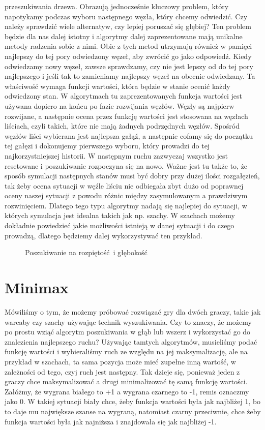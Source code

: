 przeszukiwania drzewa. Obrazują jednocześnie kluczowy problem, który napotykamy podczas wyboru następnego węzła, który chcemy odwiedzić. Czy należy sprawdzić wiele alternatyw, czy lepiej poruszać się głębiej? Ten problem będzie dla nas dalej istotny i algorytmy dalej zaprezentowane mają unikalne metody radzenia sobie z nimi. Obie z tych metod utrzymują również w pamięci najlepszy do tej pory odwiedzony węzeł, aby zwrócić go jako odpowiedź. Kiedy odwiedzamy nowy węzeł, zawsze sprawdzamy, czy nie jest lepszy od do tej pory najlepszego i jeśli tak to zamieniamy najlepszy węzeł na obecnie odwiedzany. Ta właściwość wymaga funkcji wartości, która będzie w stanie ocenić każdy odwiedzony stan. W algorytmach tu zaprezentowanych funkcja wartości jest używana dopiero na końcu po fazie rozwijania węzłów. Węzły są najpierw rozwijane, a następnie ocena przez funkcję wartości jest stosowana na węzłach liściach, czyli takich, które nie mają żadnych podrzędnych węzłów. Spośród węzłów liści wybierana jest najlepsza gałąź, a następnie cofamy się do początku tej gałęzi i dokonujemy pierwszego wyboru, który prowadzi do tej najkorzystniejszej historii. W następnym ruchu zazwyczaj wszystko jest resetowane i poszukiwanie rozpoczyna się na nowo. Ważne jest tu także to, że sposób symulacji następnych stanów musi być dobry przy dużej ilości rozgałęzień, tak żeby ocena sytuacji w węźle liściu nie odbiegała zbyt dużo od poprawnej oceny naszej sytuacji z powodu różnic między zasymulowanym a prawdziwym rozwinięciem. Dlatego tego typu algorytmy nadają się najlepiej do sytuacji, w których symulacja jest idealna takich jak np. szachy. W szachach możemy dokładnie powiedzieć jakie możliwości istnieją w danej sytuacji i do czego prowadzą, dlatego będziemy dalej wykorzystywać ten przykład.

\clearpage
\begin{figure}[H]
\centering

\caption{Poszukiwanie na rozpiętość i głębokość}
\end{figure}
\clearpage



\section{Minimax}

Mówiliśmy o tym, że możemy próbować rozwiązać gry dla dwóch graczy, takie jak warcaby czy szachy używając technik wyszukiwania. Czy to znaczy, że możemy po prostu wziąć algorytm poszukiwania w głąb lub wszerz i wykorzystać go do znalezienia najlepszego ruchu? Używając tamtych algorytmów, musieliśmy podać funkcję wartości i wybieraliśmy ruch ze względu na jej maksymalizację, ale na przykład w szachach, ta sama pozycja może mieć zupełne inną wartość, w zależności od tego, czyj ruch jest następny. Tak dzieje się, ponieważ jeden z graczy chce maksymalizować a drugi minimalizować tę samą funkcję wartości. Załóżmy, że wygrana białego to +1 a wygrana czarnego to -1, remis oznaczmy jako 0. W takiej sytuacji biały chce, żeby funkcja wartości była jak najbliżej 1, bo to daje mu największe szanse na wygraną, natomiast czarny przeciwnie, chce żeby funkcja wartości była jak najniższa i znajdowała się jak najbliżej -1.\newline

